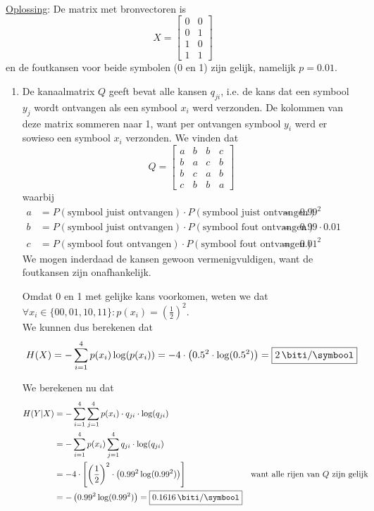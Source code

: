 \documentclass[kulak]{kulakarticle}
\begin{document}
	\hfill \\
	\underline{Oplossing}:
	De matrix met bronvectoren is \[
	X=\begin{bmatrix}
		0 & 0 \\
		0 & 1 \\
		1 & 0 \\
		1 & 1
	\end{bmatrix}\]
	en de foutkansen voor beide symbolen (0 en 1) zijn gelijk, namelijk \(p=0.01\).

	\begin{enumerate}
		\item De kanaalmatrix \(Q\) geeft bevat alle kansen \(q_{ji}\), i.e. de kans dat een symbool \(y_j\) wordt ontvangen als een symbool \(x_i\) werd verzonden. De kolommen van deze matrix sommeren naar 1, want per ontvangen symbool \(y_i\) werd er sowieso een symbool \(x_i\) verzonden. We vinden dat \[
		Q = \begin{bmatrix}
			a & b & b & c \\
			b & a & c & b \\
			b & c & a & b \\
			c & b & b & a
		\end{bmatrix}\] waarbij \begin{align*}
		 a &= P(\text{symbool juist ontvangen}) \cdot P(\text{symbool juist ontvangen}) &=&\, 0.99^2 &&\\
		 b &= P(\text{symbool juist ontvangen}) \cdot P(\text{symbool fout ontvangen}) &=&\, 0.99 \cdot 0.01&&\\
		 c &= P(\text{symbool fout ontvangen}) \cdot P(\text{symbool fout ontvangen}) &=&\, 0.01^2&&
		\end{align*}
		We mogen inderdaad de kansen gewoon vermenigvuldigen, want de foutkansen zijn onafhankelijk.

		Omdat 0 en 1 met gelijke kans voorkomen, weten we dat \(\forall x_i \in \{00,01,10,11\} : p(x_i)=\left(\frac{1}{2}\right)^2\). \\We kunnen dus berekenen dat \[
		H(X)=-\sum_{i=1}^4 p(x_i) \log(p(x_i))=-4 \cdot \left( 0.5^2 \cdot \log(0.5^2) \right) = \boxed{\SI{2}{\biti \per \symbool}} \]

		We berekenen nu dat
		\begin{align*}
			H(Y|X) &= - \sum_{i=1}^{4} \sum_{j=1}^{4} p(x_i) \cdot q_{ji} \cdot \log(q_{ji})\\
					&= - \sum_{i=1}^{4} p(x_i) \sum_{j=1}^{4} q_{ji} \cdot \log(q_{ji})\\
					&= - 4 \cdot \left[ \left(\frac{1}{2}\right)^2 \cdot \left(0.99^2\log(0.99^2)\right) \right] && \text{want alle rijen van $Q$ zijn gelijk} \\
					&= - \left(0.99^2\log(0.99^2)\right) = \boxed{\SI{0.1616}{\biti \per \symbool}}
		\end{align*}


\end{enumerate}
\end{document}
